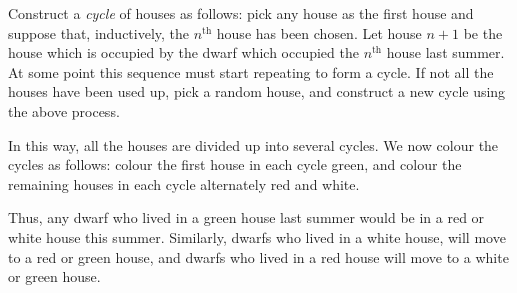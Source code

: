 Construct a \emph{cycle} of houses as follows: pick any house as the first house and suppose that, inductively, the $n^{\textrm{th}}$ house has been chosen. Let house $n+1$ be the house which is occupied by the dwarf which occupied the $n^{\textrm{th}}$ house last summer. At some point this sequence must start repeating to form a cycle. If not all the houses have been used up, pick a random house, and construct a new cycle using the above process. 

In this way, all the houses are divided up into several cycles. We now colour the cycles as follows: colour the first house in each cycle green, and colour the remaining houses in each cycle alternately red and white. 

Thus, any dwarf who lived in a green house last summer would be in a red or white house this summer. Similarly, dwarfs who lived in a white house, will move to a red or green house, and dwarfs who lived in a red house will move to a white or green house. 